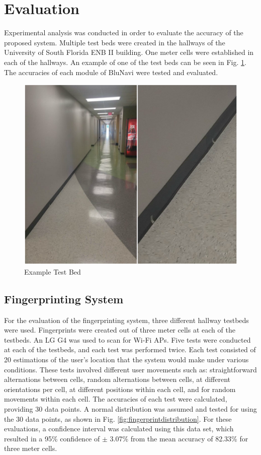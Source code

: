 \documentclass[conference]{IEEEtran}
\begin{document}
\section{Evaluation}

Experimental analysis was conducted in order to evaluate the accuracy of the proposed system. Multiple test beds were created in the hallways of the University of South Florida ENB II building. One meter cells were established in each of the hallways. An example of one of the test beds can be seen in Fig. \ref{fig:testbed}. The accuracies of each module of BluNavi were tested and evaluated.

\begin{figure}[h]
\centering
\includegraphics[scale=0.25]{TestbedCollage.png}
\caption{Example Test Bed}
\captionsetup{justification=centering,margin=2cm}
\label{fig:testbed}
\end{figure}

\subsection{Fingerprinting System}

For the evaluation of the fingerprinting system, three different hallway testbeds were used. Fingerprints were created out of three meter cells at each of the testbeds. An LG G4 was used to scan for Wi-Fi APs. Five tests were conducted at each of the testbeds, and each test was performed twice. Each test consisted of 20 estimations of the user’s location that the system would make under various conditions. These tests involved different user movements such as: straightforward alternations between cells, random alternations between cells, at different orientations per cell, at different positions within each cell, and for random movements within each cell. The accuracies of each test were calculated, providing 30 data points. A normal distribution was assumed and tested for using the 30 data points, as shown in Fig. \ref{fig:fingerprintdistribution}. For these evaluations, a confidence interval was calculated using this data set, which resulted in a 95\% confidence of $\pm$  3.07\% from the mean accuracy of 82.33\% for three meter cells.
\end{document}
